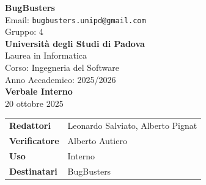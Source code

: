 \documentclass[a4paper,12pt]{article}
\begin{document}
\begin{center}  
  
  {\Large\bfseries\color{primaryblue} BugBusters}\\[0.3cm]
  {\small\color{darkgray} Email: \texttt{bugbusters.unipd@gmail.com}} \\[0.1cm]
  {\small\color{darkgray} Gruppo: 4} \\[0.5cm]

  {\large\bfseries Università degli Studi di Padova}\\[0.3cm]
  {\small Laurea in Informatica}\\[0.2cm]
  {\small Corso: Ingegneria del Software}\\[0.2cm]
  {\small Anno Accademico: 2025/2026}\\[0.8cm]

  {\Huge\bfseries\color{primaryblue} Verbale Interno}\\[0.3cm]
  {\Large\color{secondaryblue} 20 ottobre 2025}\\[0.8cm]
\end{center}

\begin{center}
\begin{tcolorbox}[colback=lightgray,colframe=primaryblue,width=0.85\textwidth,arc=3mm,boxrule=0.5pt]
\begin{tabular}{@{}ll@{}}
\textbf{Redattori}    & Leonardo Salviato, Alberto Pignat \\
\textbf{Verificatore}    & Alberto Autiero \\
\textbf{Uso}          & Interno \\
\textbf{Destinatari}  & BugBusters \\
\end{tabular}
\end{tcolorbox}
\end{center}
\end{document}
